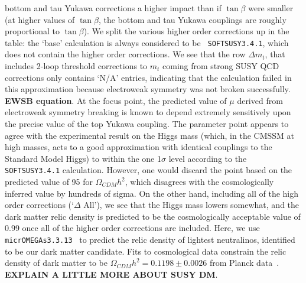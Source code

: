 \documentclass[final,3p,times,pdflatex]{elsarticle}
\begin{document}
bottom and tau Yukawa corrections a higher impact than if $\tan \beta$ were
smaller (at higher values of $\tan \beta$, the bottom and tau Yukawa couplings
are roughly proportional to $\tan \beta$).
We split the various higher order corrections up in
the table: the `base' calculation is always considered to be {\tt
  SOFTSUSY3.4.1}, which does not contain the higher order corrections. 
We see that the row $\Delta m_t$, that includes 2-loop threshold corrections
to $m_t$ coming from strong SUSY QCD corrections only contains `N/A' entries,
indicating that the calculation failed in this approximation because
electroweak symmetry was not broken successfully. {\bf EWSB equation}.
At the focus point,
the predicted value of $\mu$ derived from electroweak symmetry breaking is
known to 
depend extremely sensitively upon the precise value of the top Yukawa
coupling. 
The parameter point appears to agree with the experimental result on the Higgs
mass (which, in the CMSSM at high masses, acts to a good approximation with
identical couplings to the Standard Model Higgs)
to within the one 1$\sigma$ level according to the {\tt SOFTSUSY3.4.1}
calculation. However, one would discard the point based on the predicted value
of 95 for $\Omega_{CDM} h^2$, which disagrees with the cosmologically inferred
value by hundreds of sigma. On the other hand, including all of the high order
corrections (`$\Delta$ All'), we see that the Higgs mass lowers somewhat, and
the dark matter 
relic density is predicted to be the cosmologically acceptable value of 0.99
once all of the higher order corrections are included.
Here, we use {\tt
  micrOMEGAs3.3.13}~\cite{Belanger:2001fz,Belanger:2004yn,Belanger:2013oya} to 
predict the relic density of 
lightest neutralinos, identified to be our dark matter candidate. 
Fits to cosmological data constrain the relic density of dark matter to be
$\Omega_{CDM} h^2=0.1198 \pm 0.0026$ from Planck data~\cite{Ade:2013zuv}.
{\bf EXPLAIN A LITTLE MORE ABOUT SUSY DM}.
\end{document}

